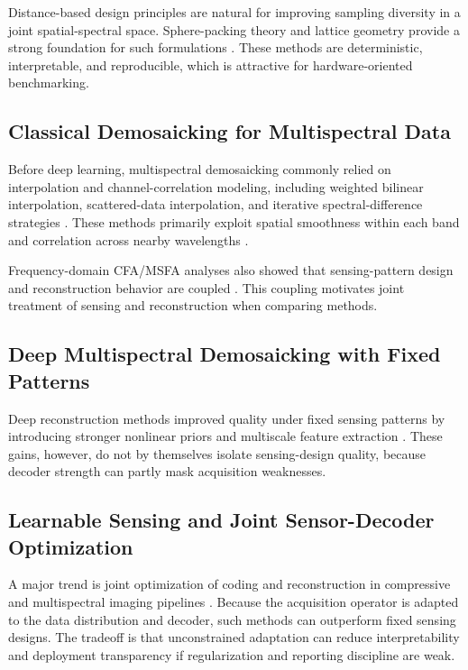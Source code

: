 \documentclass[journal]{IEEEtran}
\begin{document}
Distance-based design principles are natural for improving sampling diversity in a joint spatial-spectral space. Sphere-packing theory and lattice geometry provide a strong foundation for such formulations \cite{kepler2010,hales2005,hales2017,conway2013}. These methods are deterministic, interpretable, and reproducible, which is attractive for hardware-oriented benchmarking.

\subsection{Classical Demosaicking for Multispectral Data}
Before deep learning, multispectral demosaicking commonly relied on interpolation and channel-correlation modeling, including weighted bilinear interpolation, scattered-data interpolation, and iterative spectral-difference strategies \cite{brauers2006,amidror2002,mizutani2014}. These methods primarily exploit spatial smoothness within each band and correlation across nearby wavelengths \cite{brauers2006,mizutani2014}.

Frequency-domain CFA/MSFA analyses also showed that sensing-pattern design and reconstruction behavior are coupled \cite{hirakawa2008,jia2016}. This coupling motivates joint treatment of sensing and reconstruction when comparing methods.

\subsection{Deep Multispectral Demosaicking with Fixed Patterns}
Deep reconstruction methods improved quality under fixed sensing patterns by introducing stronger nonlinear priors and multiscale feature extraction \cite{cheng2021,wu2021}. These gains, however, do not by themselves isolate sensing-design quality, because decoder strength can partly mask acquisition weaknesses.

\subsection{Learnable Sensing and Joint Sensor-Decoder Optimization}
A major trend is joint optimization of coding and reconstruction in compressive and multispectral imaging pipelines \cite{rueda2015,correa2015,arguello2014,mejia2018}. Because the acquisition operator is adapted to the data distribution and decoder, such methods can outperform fixed sensing designs. The tradeoff is that unconstrained adaptation can reduce interpretability and deployment transparency if regularization and reporting discipline are weak.
\end{document}
